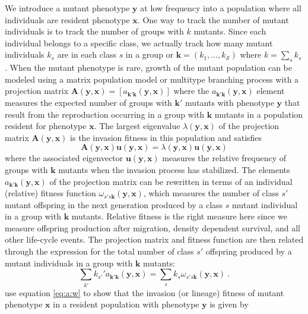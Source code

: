 \documentclass[11pt]{article}
\renewcommand{\vec}[1]{\symbf{#1}}
\newcommand{\eig}{\lambda}
\newcommand{\numc}{\mathcal{S}}
\begin{document}
We introduce a mutant phenotype $\vec{y}$ at low frequency into a population where all individuals are resident phenotype $\vec{x}$. One way to track the number of mutant individuals is to track the number of groups with $k$ mutants. Since each individual belongs to a specific class, we actually track how many mutant individuals $k_{s}$ are in each class $s$ in a group or $\vec{k} = (k_{1},\ldots,k_{\numc})$ where $k = \sum_{s} k_{s}$. When the mutant phenotype is rare, growth of the mutant population can be modeled using a matrix population model \cite{Caswell:2006} or multitype branching process \cite{Kimmel:Axelrod:2015} with a projection matrix $\vec{A}(\vec{y}, \vec{x}) = [a_{\vec{k}'\vec{k}}(\vec{y}, \vec{x})]$ where the $a_{\vec{k}'\vec{k}}(\vec{y}, \vec{x})$ element measures the expected number of groups with $\vec{k}'$ mutants with phenotype $\vec{y}$ that result from the reproduction occurring in a group with $\vec{k}$ mutants in a population resident for phenotype $\vec{x}$. The largest eigenvalue $\eig(\vec{y}, \vec{x})$ of the projection matrix $\vec{A}(\vec{y}, \vec{x})$ is the invasion fitness in this population and satisfies
\begin{equation}
  \label{eq:Au:eigu}
  \vec{A}(\vec{y}, \vec{x}) \vec{u}(\vec{y}, \vec{x}) = \eig(\vec{y}, \vec{x}) \vec{u}(\vec{y}, \vec{x})
\end{equation}
where the associated eigenvector $\vec{u}(\vec{y}, \vec{x})$ measures the relative frequency of groups with $\vec{k}$ mutants when the invasion process has stabilized. The elements $a_{\vec{k}'\vec{k}}(\vec{y}, \vec{x})$ of the projection matrix can be rewritten in terms of an individual (relative) fitness function $\omega_{s's\vec{k}}(\vec{y}, \vec{x})$, which measures the number of class $s'$ mutant offspring in the next generation produced by a class $s$ mutant individual in a group with $\vec{k}$ mutants. Relative fitness is the right measure here since we measure offspring production after migration, density dependent survival, and all other life-cycle events. The projection matrix and fitness function are then related through the expression for the total number of class $s'$ offspring produced by a mutant individuals in a group with $\vec{k}$ mutants:
\begin{equation}
  \label{eq:a:w}
  \sum_{k'} k_{s'}' a_{\vec{k}'\vec{k}}(\vec{y}, \vec{x}) = \sum_{s} k_{s} \omega_{s's\vec{k}}(\vec{y}, \vec{x}) \: .
\end{equation}
\citeauthor{Lehmann:Mullon:2016} \cite{Lehmann:Mullon:2016,Lehmann:Rousset:2020} use equation \eqref{eq:a:w} to show that the invasion (or lineage) fitness of mutant phenotype $\vec{x}$ in a resident population with phenotype $\vec{y}$ is given by
\end{document}

